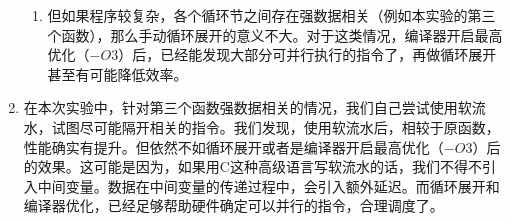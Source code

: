 \documentclass[english]{ctexart}
\begin{document}
\begin{enumerate}
\begin{enumerate}
\item 但如果程序较复杂，各个循环节之间存在强数据相关（例如本实验的第三个函数），那么手动循环展开的意义不大。对于这类情况，编译器开启最高优化（$-O3$）后，已经能发现大部分可并行执行的指令了，再做循环展开甚至有可能降低效率。
\end{enumerate}
\item 在本次实验中，针对第三个函数强数据相关的情况，我们自己尝试使用软流水，试图尽可能隔开相关的指令。我们发现，使用软流水后，相较于原函数，性能确实有提升。但依然不如循环展开或者是编译器开启最高优化（$-O3$）后的效果。这可能是因为，如果用C这种高级语言写软流水的话，我们不得不引入中间变量。数据在中间变量的传递过程中，会引入额外延迟。而循环展开和编译器优化，已经足够帮助硬件确定可以并行的指令，合理调度了。
\end{enumerate}
\end{document}
